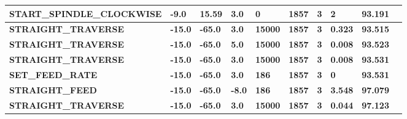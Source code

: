 \documentclass[aspectratio=169]{beamer}
\begin{document}
{\begin{frame}[fragile]
\begin{tabular}{|l|l|l|l|l|l|l|l|l|l|}
    \tiny{\bfseries{START\_SPINDLE\_CLOCKWISE}} & 
    \tiny{\bfseries{-9.0}} & 
    \tiny{\bfseries{15.59}} & 
    \tiny{\bfseries{3.0}} & 
    \tiny{\bfseries{0}} & 
    \tiny{\bfseries{1857}} & 
    \tiny{\bfseries{3}} & 
    \tiny{\bfseries{2}} & 
    \tiny{\bfseries{93.191}} \\
    \hline    

    \tiny{\bfseries{STRAIGHT\_TRAVERSE}} & 
    \tiny{\bfseries{-15.0}} & 
    \tiny{\bfseries{-65.0}} & 
    \tiny{\bfseries{3.0}} & 
    \tiny{\bfseries{15000}} & 
    \tiny{\bfseries{1857}} & 
    \tiny{\bfseries{3}} & 
    \tiny{\bfseries{0.323}} & 
    \tiny{\bfseries{93.515}} \\
    \hline

    \tiny{\bfseries{STRAIGHT\_TRAVERSE}} & 
    \tiny{\bfseries{-15.0}} & 
    \tiny{\bfseries{-65.0}} & 
    \tiny{\bfseries{5.0}} & 
    \tiny{\bfseries{15000}} & 
    \tiny{\bfseries{1857}} & 
    \tiny{\bfseries{3}} & 
    \tiny{\bfseries{0.008}} & 
    \tiny{\bfseries{93.523}} \\
    \hline

    \tiny{\bfseries{STRAIGHT\_TRAVERSE}} & 
    \tiny{\bfseries{-15.0}} & 
    \tiny{\bfseries{-65.0}} & 
    \tiny{\bfseries{3.0}} & 
    \tiny{\bfseries{15000}} & 
    \tiny{\bfseries{1857}} & 
    \tiny{\bfseries{3}} & 
    \tiny{\bfseries{0.008}} & 
    \tiny{\bfseries{93.531}} \\
    \hline

    \tiny{\bfseries{SET\_FEED\_RATE}} & 
    \tiny{\bfseries{-15.0}} & 
    \tiny{\bfseries{-65.0}} & 
    \tiny{\bfseries{3.0}} & 
    \tiny{\bfseries{186}} & 
    \tiny{\bfseries{1857}} & 
    \tiny{\bfseries{3}} & 
    \tiny{\bfseries{0}} & 
    \tiny{\bfseries{93.531}} \\
    \hline

    \tiny{\bfseries{STRAIGHT\_FEED}} & 
    \tiny{\bfseries{-15.0}} & 
    \tiny{\bfseries{-65.0}} & 
    \tiny{\bfseries{-8.0}} & 
    \tiny{\bfseries{186}} & 
    \tiny{\bfseries{1857}} & 
    \tiny{\bfseries{3}} & 
    \tiny{\bfseries{3.548}} & 
    \tiny{\bfseries{97.079}} \\
    \hline    

    \tiny{\bfseries{STRAIGHT\_TRAVERSE}} & 
    \tiny{\bfseries{-15.0}} & 
    \tiny{\bfseries{-65.0}} & 
    \tiny{\bfseries{3.0}} & 
    \tiny{\bfseries{15000}} & 
    \tiny{\bfseries{1857}} & 
    \tiny{\bfseries{3}} & 
    \tiny{\bfseries{0.044}} & 
    \tiny{\bfseries{97.123}} \\
    \hline    


\end{tabular}
\end{frame}}
\end{document}
